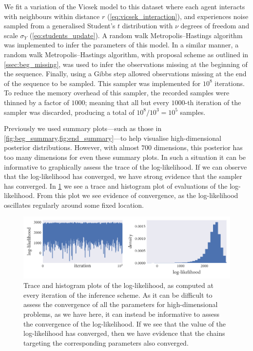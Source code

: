 We fit a variation of the Vicsek model to this dataset where each agent
interacts with neighbours within distance $r$ (\cref{eq:vicsek_interaction}),
and experiences noise sampled from a generalised Student's $t$ distribution
with $\nu$ degrees of freedom and scale $\sigma_Y$ (\cref{eq:students_update}).
A random walk Metropolis--Hastings algorithm was implemented to infer the
parameters of this model. In a similar manner, a random walk
Metropolis--Hastings algorithm, with proposal scheme as outlined in
\cref{ssec:beg_missing}, was used to infer the observations missing at the
beginning of the sequence. Finally, using a Gibbs step allowed observations
missing at the end of the sequence to be sampled. This sampler was implemented
for $10^8$ iterations. To reduce the memory overhead of this sampler, the
recorded samples were thinned by a factor of $1000$; meaning that all but every
$1000$-th iteration of the sampler was discarded, producing a total of $10^8 /
10^3 = 10^5$ samples.

Previously we used summary plots---such as those in
\cref{fig:beg_summary,fig:end_summary}---to help visualise high-dimensional
posterior distributions. However, with almost $700$ dimensions, this posterior
has too many dimensions for even these summary plots. In such a situation it
can be informative to graphically assess the trace of the log-likelihood. If we
can observe that the log-likelihood has converged, we have strong evidence that
the sampler has converged. In \cref{fig:log_ll} we see a trace and histogram
plot of evaluations of the log-likelihood. From this plot we see evidence of
convergence, as the log-likelihood oscillates regularly around some fixed
location.

\begin{figure}[tb]
  \includegraphics{log_likelihood.pdf}
  \caption{Trace and histogram plots of the log-likelihood, as computed at
    every iteration of the inference scheme. As it can be difficult to assess
    the convergence of all the parameters for high-dimensional problems, as
    we have here, it can instead be informative to assess the convergence of
    the log-likelihood. If we see that the value of the log-likelihood has
    converged, then we have evidence that the chains targeting the corresponding
    parameters also converged.}
    \label{fig:log_ll}
\end{figure}

